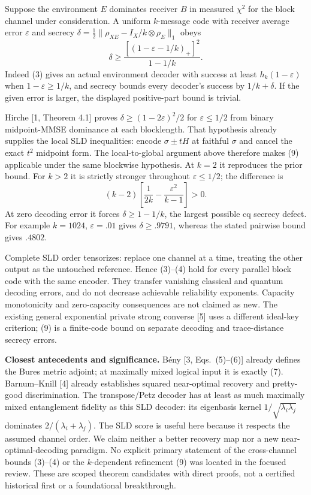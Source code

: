 \documentclass[10pt,a4paper]{article}
\begin{document}
Suppose the environment $E$ dominates receiver $B$ in measured $\chi^2$ for the block channel under consideration. A uniform $k$-message code with receiver average error $\varepsilon$ and secrecy
$\delta=\tfrac12\|\rho_{XE}-I_X/k\otimes\rho_E\|_1$ obeys
\[
 \boxed{\quad
 \delta\ge\frac{[(1-\varepsilon-1/k)_+]^2}{1-1/k}.
 \quad} \tag{9}
\]
Indeed (3) gives an actual environment decoder with success at least $h_k(1-\varepsilon)$ when $1-\varepsilon\ge1/k$, and secrecy bounds every decoder's success by $1/k+\delta$. If the given error is larger, the displayed positive-part bound is trivial.

Hirche [1, Theorem 4.1] proves $\delta\ge(1-2\varepsilon)^2/2$ for $\varepsilon\le1/2$ from binary midpoint-MMSE dominance at each blocklength. That hypothesis already supplies the local SLD inequalities: encode $\sigma\pm tH$ at faithful $\sigma$ and cancel the exact $t^2$ midpoint form. The local-to-global argument above therefore makes (9) applicable under the same blockwise hypothesis. At $k=2$ it reproduces the prior bound. For $k>2$ it is strictly stronger throughout $\varepsilon\le1/2$; the difference is
\[
 (k-2)\left[\frac1{2k}-\frac{\varepsilon^2}{k-1}\right]>0.
\]
At zero decoding error it forces $\delta\ge1-1/k$, the largest possible cq secrecy defect. For example $k=1024$, $\varepsilon=.01$ gives $\delta\ge.9791$, whereas the stated pairwise bound gives $.4802$.

Complete SLD order tensorizes: replace one channel at a time, treating the other output as the untouched reference. Hence (3)--(4) hold for every parallel block code with the same encoder. They transfer vanishing classical and quantum decoding errors, and do not decrease achievable reliability exponents. Capacity monotonicity and zero-capacity consequences are not claimed as new. The existing general exponential private strong converse [5] uses a different ideal-key criterion; (9) is a finite-code bound on separate decoding and trace-distance secrecy errors.

\textbf{Closest antecedents and significance.} B\'eny [3, Eqs.~(5)--(6)] already defines the Bures metric adjoint; at maximally mixed logical input it is exactly (7). Barnum--Knill [4] already establishes squared near-optimal recovery and pretty-good discrimination. The transpose/Petz decoder has at least as much maximally mixed entanglement fidelity as this SLD decoder: its eigenbasis kernel $1/\sqrt{\lambda_i\lambda_j}$ dominates $2/(\lambda_i+\lambda_j)$. The SLD score is useful here because it respects the assumed channel order. We claim neither a better recovery map nor a new near-optimal-decoding paradigm. No explicit primary statement of the cross-channel bounds (3)--(4) or the $k$-dependent refinement (9) was located in the focused review. These are scoped theorem candidates with direct proofs, not a certified historical first or a foundational breakthrough.
\end{document}

